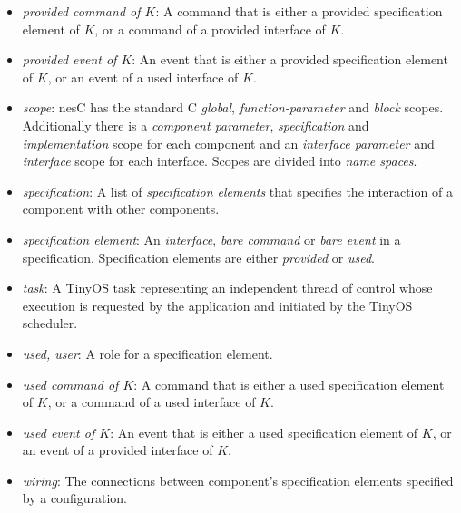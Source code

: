 \documentclass[11pt,letterpaper]{article}
\newcommand{\nesc}{nesC\xspace}
\newcommand{\tinyos}{TinyOS\xspace}
\begin{document}
\begin{itemize}
\item \emph{provided command of $K$}: A command that is either a
provided specification element of $K$, or a command of a provided interface
of $K$.

\item \emph{provided event of $K$}: An event that is either a
provided specification element of $K$, or an event of a used interface
of $K$.

\item \emph{scope}: \nesc has the standard C \emph{global},
\emph{function-parameter} and \emph{block} scopes. Additionally there is a
\emph{component parameter}, \emph{specification} and \emph{implementation}
scope for each component and an \emph{interface parameter} and
\emph{interface} scope for each interface. Scopes are divided into
\emph{name spaces}.

\item \emph{specification}: A list of \emph{specification elements} that
specifies the interaction of a component with other components.

\item \emph{specification element}: An \emph{interface}, \emph{bare
command} or \emph{bare event} in a specification. Specification elements
are either \emph{provided} or \emph{used}.

\item \emph{task}: A \tinyos task representing an independent thread of
control whose execution is requested by the application and initiated
by the \tinyos scheduler.

\item \emph{used, user}: A role for a specification element.

\item \emph{used command of $K$}: A command that is either a used specification
element of $K$, or a command of a used interface of $K$.

\item \emph{used event of $K$}: An event that is either a used specification
element of $K$, or an event of a provided interface of $K$.

\item \emph{wiring}: The connections between component's specification
elements specified by a configuration.

\end{itemize}




\end{document}
